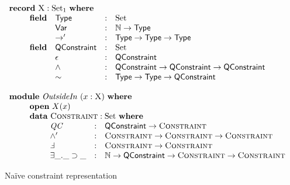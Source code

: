 \documentclass[a4paper]{jfp}
\begin{document}
\begin{figure}[H]
\begin{displaymath}
   \begin{array}{l}
   \textbf{record}\ \textsc{X} : \text{Set}_1\ \textbf{where} \\ \qquad
   \begin{array}{llcl} 
   \textbf{field} & \textsf{Type} & : &  \text{Set} \\ 
                  & \textsf{Var} & : & \mathbb{N} \rightarrow \textsf{Type} \\
                  & \rightarrow' & : & \textsf{Type} \rightarrow \textsf{Type} \rightarrow \textsf{Type} \\
   \textbf{field} & \textsf{QConstraint} & : & \text{Set} \\
                  & \epsilon & : & \textsf{QConstraint} \\
                  & \land & : & \textsf{QConstraint} \rightarrow \textsf{QConstraint} \rightarrow \textsf{QConstraint} \\
                  & \sim & : & \textsf{Type} \rightarrow \textsf{Type} \rightarrow \textsf{QConstraint} \\
   \end{array}\\\\
   \textbf{module}\ \mathit{OutsideIn}\ ( x : \textsc{X})\ \textbf{where} \\ \qquad 
	\begin{array}{l}
      \textbf{open}\  X(x)\\ 
		\textbf{data}\  \textsc{Constraint} : \text{Set}\ \textbf{where} \\ \qquad
		               \begin{array}{lcl}
                   \mathit{QC} & : & \textsf{QConstraint} \rightarrow \textsc{Constraint} \\
						 \land'   & : & \textsc{Constraint} \rightarrow \textsc{Constraint} \rightarrow \textsc{Constraint} \\
						 \Finv    & : & \textsc{Constraint} \rightarrow \textsc{Constraint} \\
                   \exists\_.\_\supset\_ & : & \mathbb{N} \rightarrow \textsf{QConstraint} \rightarrow \textsc{Constraint} \rightarrow \textsc{Constraint}
					    \end{array} \\
     \end{array}
   \end{array}
\end{displaymath}
\caption{Na\"ive constraint representation}
\end{figure}
\end{document}
